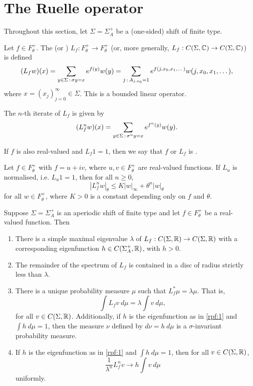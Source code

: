 \section{The Ruelle operator}
Throughout this section, let $\Sigma = \Sigma_A^+$ be a (one-sided) shift of finite type.

\begin{definition}
	Let $f \in F_\theta^+$. The  (or ) $L_f : F_\theta^+ \to F_\theta^+$ (or, more generally, $L_f : C(\Sigma, \mathbb{C}) \to C(\Sigma, \mathbb{C})$) is defined
	\[
		(L_f{w})(x) = \sum_{y \in \Sigma \,:\, \sigma{y} = x}{e^{f(y)} w(y)} = \sum_{j \,:\, A_{j, x_0} = 1}{e^{f(j, x_0, x_1, \dots)} w(j, x_0, x_1, \dots)},
	\]
	where $x = (x_j)_{j = 0}^\infty \in \Sigma$. This is a bounded linear operator.
	
	The $n$-th iterate of $L_f$ is given by
	\[
		(L_f^n{w})(x) = \sum_{y \in \Sigma \,:\, \sigma^n{y} = x}{e^{f^n(y)} w(y)}.
	\]
	
	If $f$ is also real-valued and $L_f{1} = 1$, then we say that $f$ or $L_f$ is .
\end{definition}

\begin{proposition}
	Let $f \in F_\theta^+$ with $f = u + iv$, where $u, v \in F_\theta^+$ are real-valued functions. If $L_u$ is normalised, i.e. $L_u{1} = 1$, then for all $n \geq 0$,
	\[
		|L_f^n{w}|_\theta \leq K|w|_\infty + \theta^n |w|_\theta
	\]
	for all $w \in F_\theta^+$, where $K > 0$ is a constant depending only on $f$ and $\theta$.
\end{proposition}

\begin{theorem} \label{thm:rpf}
	Suppose $\Sigma = \Sigma_A^+$ is an aperiodic shift of finite type and let $f \in F_\theta^+$ be a real-valued function. Then
	\begin{enumerate}
		\item There is a simple maximal eigenvalue $\lambda$ of $L_f : C(\Sigma, \mathbb{R}) \to C(\Sigma, \mathbb{R})$ with a corresponding eigenfunction $h \in C(\Sigma_A^+, \mathbb{R})$, with $h > 0$. \label{rpf:1}
		\item The remainder of the spectrum of $L_f$ is contained in a disc of radius strictly less than $\lambda$. \label{rpf:2}
		\item There is a unique probability measure $\mu$ such that $L_f^*{\mu} = \lambda\mu$. That is,
		\[
			\int{L_f{v}\ d\mu} = \lambda \int{v\ d\mu},
		\]
		for all $v \in C(\Sigma, \mathbb{R})$. Additionally, if $h$ is the eigenfunction as in \ref{rpf:1} and $\int{h\ d\mu} = 1$, then the measure $\nu$ defined by $d\nu = h\ d\mu$ is a $\sigma$-invariant probability measure. \label{rpf:3}
		\item If $h$ is the eigenfunction as in \ref{rpf:1} and $\int{h\ d\mu} = 1$, then for all $v \in C(\Sigma, \mathbb{R})$,
		\[
			\frac{1}{\lambda^n}L_f^n{v} \to h \int{v\ d\mu}
		\]
		uniformly. \label{rpf:4}
	\end{enumerate}
\end{theorem}
